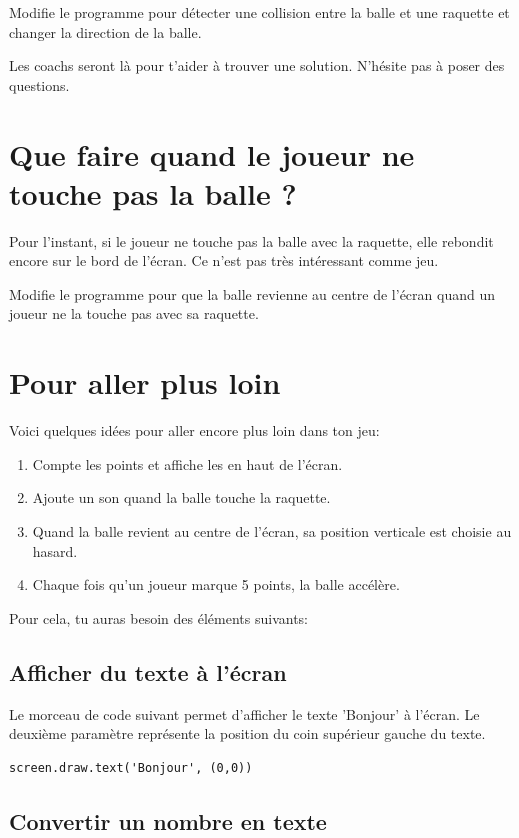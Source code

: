 \documentclass[11pt]{article}
\begin{document}
Modifie le programme pour détecter une collision entre la balle et une raquette et changer la direction de la balle.

Les coachs seront là pour t'aider à trouver une solution.
N'hésite pas à poser des questions.

\section{Que faire quand le joueur ne touche pas la balle ?}

Pour l'instant, si le joueur ne touche pas la balle avec la raquette, elle rebondit encore sur le bord de l'écran. Ce n'est pas très intéressant comme jeu.

Modifie le programme pour que la balle revienne au centre de l'écran quand un joueur ne la touche pas avec sa raquette.

\section{Pour aller plus loin}

Voici quelques idées pour aller encore plus loin dans ton jeu:
\begin{enumerate}
    \item Compte les points et affiche les en haut de l'écran.
    \item Ajoute un son quand la balle touche la raquette.
    \item Quand la balle revient au centre de l'écran, sa position verticale est choisie au hasard.
    \item Chaque fois qu'un joueur marque 5 points, la balle accélère.
\end{enumerate}

Pour cela, tu auras besoin des éléments suivants:

\subsection*{Afficher du texte à l'écran}

Le morceau de code suivant permet d'afficher le texte 'Bonjour' à l'écran. Le deuxième paramètre représente la position du coin supérieur gauche du texte.

\begin{lstlisting}
screen.draw.text('Bonjour', (0,0))
\end{lstlisting}

\subsection*{Convertir un nombre en texte}
\end{document}
